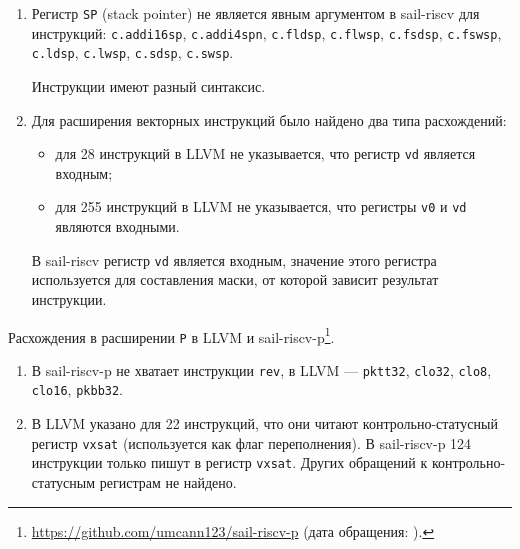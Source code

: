 \begin{enumerate}
  \item Регистр \texttt{SP} (stack pointer) не является явным аргументом в sail-riscv для инструкций:
        \texttt{c.addi16sp}, \texttt{c.addi4spn}, \texttt{c.fldsp}, \texttt{c.flwsp}, \texttt{c.fsdsp}, \texttt{c.fswsp}, \texttt{c.ldsp}, \texttt{c.lwsp}, \texttt{c.sdsp}, \texttt{c.swsp}.

        Инструкции имеют разный синтаксис.





  \item Для расширения векторных инструкций было найдено два типа расхождений:
        \begin{itemize}
          \item для 28 инструкций в LLVM не указывается, что регистр \texttt{vd} является входным;
          \item для 255 инструкций в LLVM не указывается, что регистры \texttt{v0} и \texttt{vd} являются входными.
        \end{itemize}
        В sail-riscv регистр \texttt{vd} является входным, значение этого регистра используется для составления маски, от которой зависит результат инструкции.

\end{enumerate}

Расхождения в расширении \texttt{P} в LLVM и sail-riscv-p\footnote{\url{https://github.com/umcann123/sail-riscv-p} (дата обращения: ).}.
\begin{enumerate}
  \item В sail-riscv-p не хватает инструкции \texttt{rev}, в LLVM --- \texttt{pktt32}, \texttt{clo32}, \texttt{clo8}, \texttt{clo16}, \texttt{pkbb32}.


  \item В LLVM указано для 22 инструкций, что они читают контрольно-статусный регистр \texttt{vxsat} (используется как флаг переполнения).
        В sail-riscv-p 124 инструкции только пишут в регистр \texttt{vxsat}.
        Других обращений к контрольно-статусным регистрам не найдено.

\end{enumerate}


